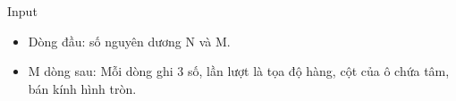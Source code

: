 Input
\begin{itemize}
	\item     Dòng đầu: số nguyên dương N và M.   
\end{itemize}
\begin{itemize}
	\item     M dòng sau: Mỗi dòng ghi 3 số, lần lượt là tọa độ hàng, cột của ô chứa tâm, bán kính hình tròn.   
\end{itemize}